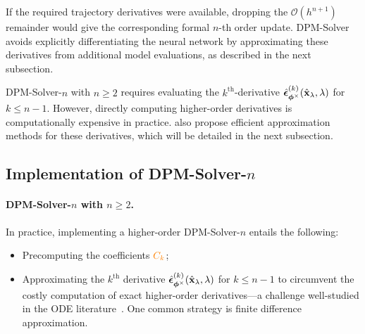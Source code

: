 If the required trajectory derivatives were available, dropping the
$\mathcal O(h^{n+1})$ remainder would give the corresponding formal
$n$-th order update. DPM-Solver avoids explicitly differentiating the neural
network by approximating these derivatives from additional model evaluations,
as described in the next subsection.


DPM-Solver-$n$ with $n \geq 2$ requires evaluating the $k^{\text{th}}$-derivative {\color{cyan}$\hat{\bm{\epsilon}}_{\bm{\phi}^\times}^{(k)}(\hat{{\mathbf{x}}}_\lambda, \lambda)$} for $k \leq n-1$. However, directly computing higher-order derivatives is computationally expensive in practice. \citet{lu2022dpm} also propose efficient approximation methods for these derivatives, which will be detailed in the next subsection.

 
\subsection{Implementation of DPM-Solver-$n$}\label{subsec:dpm-n-method} 

\paragraph{DPM-Solver-$n$ with $n \geq 2$.}
In practice, implementing a higher-order DPM-Solver-$n$ entails the following:
\begin{itemize}
    \item Precomputing the coefficients ${\color{orange}C_k}$;
    \item Approximating the $k^{\text{th}}$ derivative {\color{cyan}$\hat{\bm{\epsilon}}_{\bm{\phi}^\times}^{(k)}(\hat{{\mathbf{x}}}_\lambda,\lambda)$} for $k \leq n-1$ to circumvent the costly computation of exact higher-order derivatives—a challenge well-studied in the ODE literature~\citep{hochbruck2005explicit,luan2021efficient}. One common strategy is finite difference approximation.
\end{itemize}

